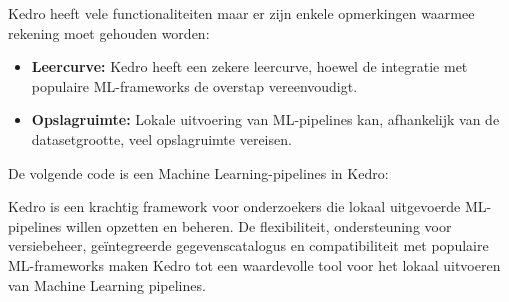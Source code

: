 Kedro heeft vele functionaliteiten maar er zijn enkele opmerkingen waarmee rekening moet gehouden worden:

\begin{itemize}
    \item \textbf{Leercurve:} Kedro heeft een zekere leercurve, hoewel de integratie met populaire ML-frameworks de overstap vereenvoudigt.
    \item \textbf{Opslagruimte:} Lokale uitvoering van ML-pipelines kan, afhankelijk van de datasetgrootte, veel opslagruimte vereisen.
\end{itemize}


De volgende code is een Machine Learning-pipelines in Kedro: 








Kedro is een krachtig framework voor onderzoekers die lokaal uitgevoerde ML-pipelines willen opzetten en beheren. De flexibiliteit, ondersteuning voor versiebeheer, geïntegreerde gegevenscatalogus en compatibiliteit met populaire ML-frameworks maken Kedro tot een waardevolle tool voor het lokaal uitvoeren van Machine Learning pipelines.

